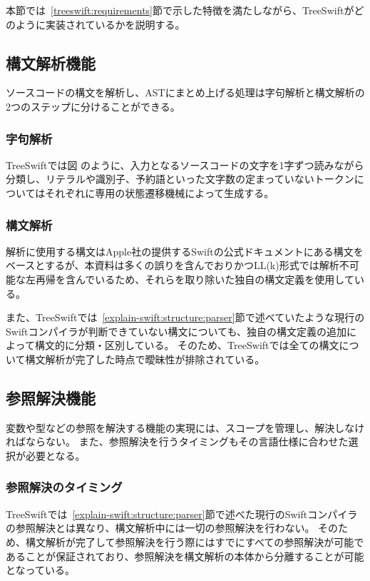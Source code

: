 本節では~\ref{treeswift:requirements}節で示した特徴を満たしながら、TreeSwiftがどのように実装されているかを説明する。


\subsection{構文解析機能}

ソースコードの構文を解析し、ASTにまとめ上げる処理は字句解析と構文解析の2つのステップに分けることができる。

\subsubsection{字句解析}

TreeSwiftでは図%
のように、入力となるソースコードの文字を1字ずつ読みながら分類し、リテラルや識別子、予約語といった文字数の定まっていないトークンについてはそれぞれに専用の状態遷移機械によって生成する。

\subsubsection{構文解析}

解析に使用する構文はApple社の提供するSwiftの公式ドキュメントにある構文をベースとするが、本資料は多くの誤りを含んでおりかつLL(k)形式では解析不可能な左再帰を含んでいるため、それらを取り除いた独自の構文定義を使用している。

また、TreeSwiftでは~\ref{explain-swift:structure:parser}節で述べていたような現行のSwiftコンパイラが判断できていない構文についても、独自の構文定義の追加によって構文的に分類・区別している。
そのため、TreeSwiftでは全ての構文について構文解析が完了した時点で曖昧性が排除されている。


\subsection{参照解決機能}

変数や型などの参照を解決する機能の実現には、スコープを管理し、解決しなければならない。
また、参照解決を行うタイミングもその言語仕様に合わせた選択が必要となる。

\subsubsection{参照解決のタイミング}

TreeSwiftでは~\ref{explain-swift:structure:parser}節で述べた現行のSwiftコンパイラの参照解決とは異なり、構文解析中には一切の参照解決を行わない。
そのため、構文解析が完了して参照解決を行う際にはすでにすべての参照解決が可能であることが保証されており、参照解決を構文解析の本体から分離することが可能となっている。

